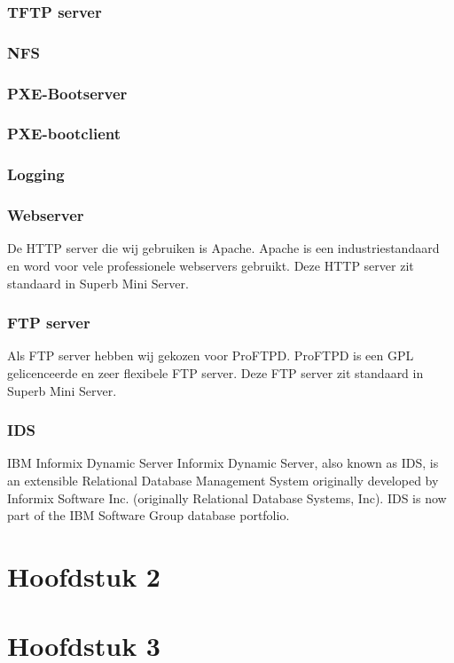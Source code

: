 \documentclass[12pt]{article}
\begin{document}
\subsubsection{TFTP server}
\subsubsection{NFS}
\subsubsection{PXE-Bootserver}
\subsubsection{PXE-bootclient}
\subsubsection{Logging}
\subsubsection{Webserver}
De HTTP server die wij gebruiken is Apache. Apache is een industriestandaard en word voor vele professionele webservers gebruikt. Deze HTTP server zit standaard in Superb Mini Server.
\subsubsection{FTP server}
Als FTP server hebben wij gekozen voor ProFTPD. ProFTPD is een GPL gelicenceerde en zeer flexibele FTP server. Deze FTP server zit standaard in Superb Mini Server.
\subsubsection{IDS}
IBM Informix Dynamic Server
Informix Dynamic Server, also known as IDS, is an extensible Relational Database Management System originally developed by Informix Software Inc. (originally Relational Database Systems, Inc). IDS is now part of the IBM Software Group database portfolio.
\section{Hoofdstuk 2}
\lipsum[0-4]
\section{Hoofdstuk 3}
\lipsum[0-4]
\clearpage 
\end{document}
